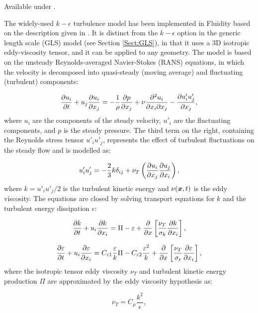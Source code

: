 Available under .

The widely-used $k-\epsilon$ turbulence model has been implemented in Fluidity based on the description given in
\citet{mathieu2000}. It is distinct from the $k-\epsilon$ option in the generic length scale (GLS) model (see
Section \ref{Sect:GLS}), in that it uses a 3D isotropic eddy-viscosity tensor, and it can be applied to any geometry.
The model is based on the unsteady Reynolds-averaged Navier-Stokes (RANS) equations, in which the velocity is decomposed into quasi-steady (moving average) and fluctuating (turbulent) components:

\begin{equation}\label{RANS}
\ppt[t]{u_i} + u_j \ppx[x_j]{u_i} = - \frac{1}{\rho } \ppx[x_j]{p} + \nu \frac{\partial^2 u_i}{\partial x_i \partial x_j} - \ppx[x_j]{u'_i u'_j},
\end{equation}
where $u_i$ are the components of the steady velocity, $u'_i$ are the fluctuating components, and $p$ is the steady pressure.
The third term on the right, containing the Reynolds stress tensor $u'_i u'_j$, represents the effect of turbulent fluctuations on the steady flow and is modelled as:

\begin{equation}\label{retens}
u'_i u'_j = - \frac 2 3 k \delta_{ij} + \nu_T \left (\ppx[x_j]{u_i} \ppx[x_i]{u_j} \right ),
\end{equation}
where $k=u'_i u'_j/2$ is the turbulent kinetic energy and $\nu(\bmx,t)$ is the eddy viscosity.
The equations are closed by solving transport equations for $k$ and the turbulent energy dissipation $\epsilon$:

\begin{equation}\label{k}
\ppt[t]{k} + u_i \ppx[x_i]{k} = \Pi - \epsilon + \ppx{} \left [ \frac{\nu_T}{\sigma_k} \ppx[x_i]{k} \right ],
\end{equation}

\begin{equation}\label{eps}
\ppt[t]{\epsilon} + u_i \ppx[x_i]{\epsilon} = C_{\epsilon1} \frac {\epsilon}{k} \Pi - C_{\epsilon2} \frac{\epsilon^2}{k} + \ppx{} \left [ \frac{\nu_T}{\sigma_\epsilon} \ppx[x_i]{\epsilon} \right ],
\end{equation}
where the isotropic tensor eddy viscosity $\nu_T$ and turbulent kinetic energy production $\Pi$ are approximated by the eddy viscosity hypothesis as:

\begin{equation}\label{nut}
\nu_T = C_\mu \frac{k^2}{\epsilon},
\end{equation}


